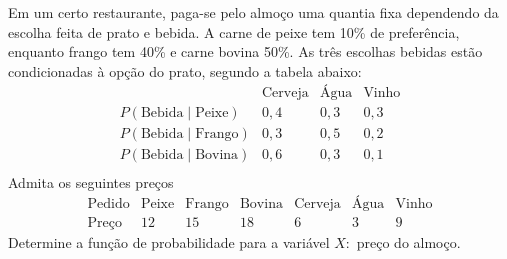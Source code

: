 %
%


\begin{exercicioBanco}[\valorquestao]
Em um certo restaurante, paga-se pelo almoço uma quantia fixa dependendo da escolha feita de prato e bebida. A carne de peixe tem 10\% de preferência, enquanto frango tem 40\% e carne bovina 50\%. As três escolhas bebidas estão condicionadas à opção do prato, segundo a tabela abaixo:
%
\[
    \begin{array}{c|c|c|c}
         & \text{Cerveja} & \text{Água} & \text{Vinho} \\
         \hline
         P(\text{Bebida}\mid\text{Peixe}) & 0,4 & 0,3 & 0,3 \\
         P(\text{Bebida}\mid\text{Frango}) & 0,3 & 0,5 & 0,2 \\
         P(\text{Bebida}\mid\text{Bovina}) & 0,6 & 0,3 & 0,1 \\
    \end{array}
\]
%
Admita os seguintes preços
%
\[
    \begin{array}{c|c|c|c|c|c|c}
        \text{Pedido} & \text{Peixe} & \text{Frango} & \text{Bovina} & \text{Cerveja} & \text{Água} & \text{Vinho} \\ 
        \hline
        \text{Preço} & 12 & 15 & 18 & 6 & 3 & 9
    \end{array}
\]
%
Determine a função de probabilidade para a variável \(X:\) preço do almoço.
\end{exercicioBanco}

